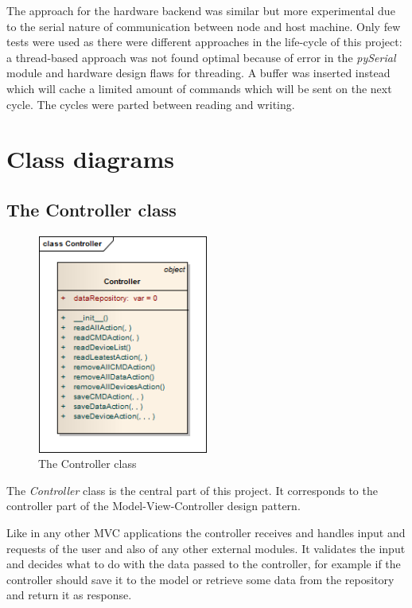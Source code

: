 The approach for the hardware backend was similar but more experimental due to the serial nature of communication between node and host machine. Only
few tests were used as there were different approaches in the life-cycle of this project: a thread-based approach was not found optimal because 
of error in the \textit{pySerial} module and hardware design flaws for threading. A buffer was inserted instead which will cache a limited amount of commands which
will be sent on the next cycle. The cycles were parted between reading and writing.

\section{Class diagrams}
\subsection{The Controller class}
\begin{figure}[H]
   \centering
   \includegraphics[width=0.5\textwidth]{pic/Controller.png}%
   \caption{The Controller class}
   \label{Controllerpic}%
\end{figure}

The \textit{Controller} class is the central part of this project. It corresponds to the controller part of the Model-View-Controller design pattern.

Like in any other MVC applications the controller receives and handles input and requests of the user and also of any other external modules. 
It validates the input and decides what to do with the data passed to the controller, 
for example if the controller should save it to the model or retrieve some data from the repository and return it as response.

